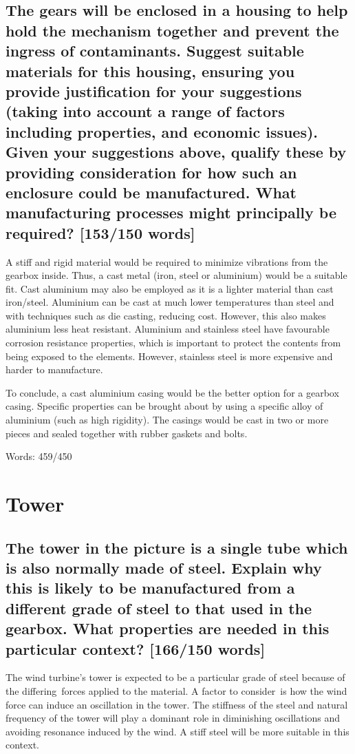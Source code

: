 \documentclass[12pt]{article}
\numberwithin{equation}{section}
\begin{document}
\begin{flushleft}
\subsection[Gearbox casing material.]{The gears will be enclosed in a housing to help hold the mechanism together and prevent the ingress of contaminants. Suggest suitable materials for this housing, ensuring you provide justification for your suggestions (taking into account a range of factors including properties, and economic issues). Given your suggestions above, qualify these by providing consideration for how such an enclosure could be manufactured. What manufacturing processes might principally be required? [153/150 words]}
A stiff and rigid material would be required to minimize vibrations from the gearbox inside. Thus, a cast metal (iron, steel or aluminium) would be a suitable fit. Cast aluminium may also be employed as it is a lighter material than cast iron/steel. Aluminium can be cast at much lower temperatures than steel and with techniques such as die casting, reducing cost. However, this also makes aluminium less heat resistant. Aluminium and stainless steel have favourable corrosion resistance properties, which is important to protect the contents from being exposed to the elements. However, stainless steel is more expensive and harder to manufacture.

To conclude, a cast aluminium casing would be the better option for a gearbox casing. Specific properties can be brought about by using a specific alloy of aluminium (such as high rigidity). The casings would be cast in two or more pieces and sealed together with rubber gaskets and bolts.

Words: 459/450

\section{Tower}
\subsection[Tower steel.]{The tower in the picture is a single tube which is also normally made of steel. Explain why this is likely to be manufactured from a different grade of steel to that used in the gearbox. What properties are needed in this particular context? [166/150 words]}
The wind turbine’s tower is expected to be a particular grade of steel because of the differing forces applied to the material. A factor to consider is how the wind force can induce an oscillation in the tower. The stiffness of the steel and natural frequency of the tower will play a dominant role in diminishing oscillations and avoiding resonance induced by the wind. A stiff steel will be more suitable in this context. 


\end{flushleft}
\end{document}
